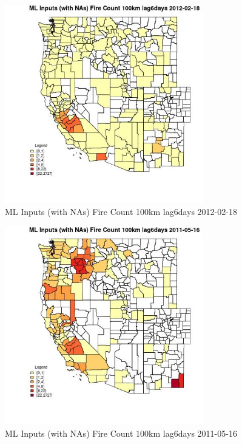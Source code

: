 \begin{figure} 
\centering  
\includegraphics[width=0.77\textwidth]{Code_Outputs/Report_ML_input_PM25_Step4_part_f_de_duplicated_aveswNAs_CountyFire_Count_100km_lag6daysMean2012-02-18.jpg} 
\caption{\label{fig:Report_ML_input_PM25_Step4_part_f_de_duplicated_aveswNAsCountyFire_Count_100km_lag6daysMean2012-02-18}ML Inputs (with NAs) Fire Count 100km lag6days 2012-02-18} 
\end{figure} 
 

\begin{figure} 
\centering  
\includegraphics[width=0.77\textwidth]{Code_Outputs/Report_ML_input_PM25_Step4_part_f_de_duplicated_aveswNAs_CountyFire_Count_100km_lag6daysMean2011-05-16.jpg} 
\caption{\label{fig:Report_ML_input_PM25_Step4_part_f_de_duplicated_aveswNAsCountyFire_Count_100km_lag6daysMean2011-05-16}ML Inputs (with NAs) Fire Count 100km lag6days 2011-05-16} 
\end{figure} 
 

